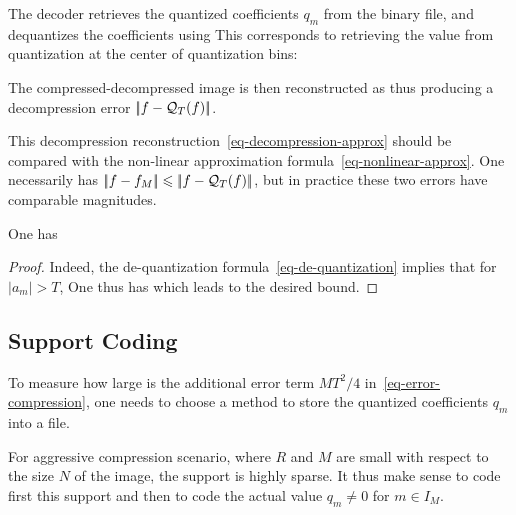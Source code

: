 The decoder retrieves the quantized coefficients $q_m$ from the binary file, and dequantizes the coefficients using
This corresponds to retrieving the value from quantization at the center of quantization bins:
\begin{center}
\end{center}

The compressed-decompressed image is then reconstructed as
thus producing a decompression error $|\!| f-\mathcal{Q}_T(f) |\!|$.

This decompression reconstruction~\eqref{eq-decompression-approx} should be compared with the non-linear approximation formula~\eqref{eq-nonlinear-approx}. One necessarily has $|\!| f-f_M |\!| \leqslant |\!| f-\mathcal{Q}_T(f) |\!|$, but in practice these two errors have comparable magnitudes. 

\begin{prop}\label{prop-error-compression}
	One has 
\end{prop}

\begin{proof}
Indeed, the de-quantization formula~\eqref{eq-de-quantization} implies that for $|a_m|>T$,
One thus has
which leads to the desired bound.
\end{proof}


\subsection{Support Coding}
\label{subsec-support-coding}

To measure how large is the additional error term $M T^2/4$ in~\eqref{eq-error-compression}, one needs to choose a method to store the quantized coefficients $q_m$ into a file. 

For aggressive compression scenario, where $R$ and $M$ are small with respect to the size $N$ of the image, the support 
is highly sparse. It thus make sense to code first this support and then to code the actual value $q_m \neq 0$ for $m \in I_M$.

